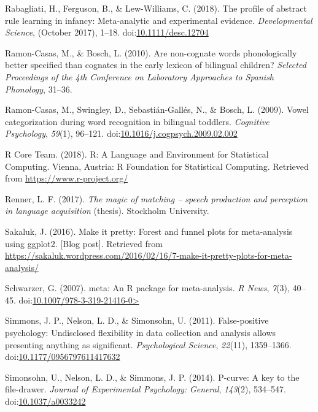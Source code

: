 \documentclass[man]{apa6}
\begin{document}
\leavevmode\hypertarget{ref-Rabagliati2018}{}%
Rabagliati, H., Ferguson, B., \& Lew-Williams, C. (2018). The profile of abstract rule learning in infancy: Meta-analytic and experimental evidence. \emph{Developmental Science}, (October 2017), 1--18. doi:\href{https://doi.org/10.1111/desc.12704}{10.1111/desc.12704}

\leavevmode\hypertarget{ref-Ramon-Casas2010}{}%
Ramon-Casas, M., \& Bosch, L. (2010). Are non-cognate words phonologically better specified than cognates in the early lexicon of bilingual children? \emph{Selected Proceedings of the 4th Conference on Laboratory Approaches to Spanish Phonology}, 31--36.

\leavevmode\hypertarget{ref-Ramon-Casas2009}{}%
Ramon-Casas, M., Swingley, D., Sebastián-Gallés, N., \& Bosch, L. (2009). Vowel categorization during word recognition in bilingual toddlers. \emph{Cognitive Psychology}, \emph{59}(1), 96--121. doi:\href{https://doi.org/10.1016/j.cogpsych.2009.02.002}{10.1016/j.cogpsych.2009.02.002}

\leavevmode\hypertarget{ref-R}{}%
R Core Team. (2018). R: A Language and Environment for Statistical Computing. Vienna, Austria: R Foundation for Statistical Computing. Retrieved from \url{https://www.r-project.org/}

\leavevmode\hypertarget{ref-Renner2017}{}%
Renner, L. F. (2017). \emph{The magic of matching -- speech production and perception in language acquisition} (thesis). Stockholm University.

\leavevmode\hypertarget{ref-Sakaluk2016}{}%
Sakaluk, J. (2016). Make it pretty: Forest and funnel plots for meta-analysis using ggplot2. {[}Blog post{]}. Retrieved from \url{https://sakaluk.wordpress.com/2016/02/16/7-make-it-pretty-plots-for-meta-analysis/}

\leavevmode\hypertarget{ref-meta}{}%
Schwarzer, G. (2007). meta: An R package for meta-analysis. \emph{R News}, \emph{7}(3), 40--45. doi:\href{https://doi.org/10.1007/978-3-319-21416-0\%3E}{10.1007/978-3-319-21416-0\textgreater{}}

\leavevmode\hypertarget{ref-Simmons2011}{}%
Simmons, J. P., Nelson, L. D., \& Simonsohn, U. (2011). False-positive psychology: Undisclosed flexibility in data collection and analysis allows presenting anything as significant. \emph{Psychological Science}, \emph{22}(11), 1359--1366. doi:\href{https://doi.org/10.1177/0956797611417632}{10.1177/0956797611417632}

\leavevmode\hypertarget{ref-pcurve}{}%
Simonsohn, U., Nelson, L. D., \& Simmons, J. P. (2014). P-curve: A key to the file-drawer. \emph{Journal of Experimental Psychology: General}, \emph{143}(2), 534--547. doi:\href{https://doi.org/10.1037/a0033242}{10.1037/a0033242}
\end{document}
